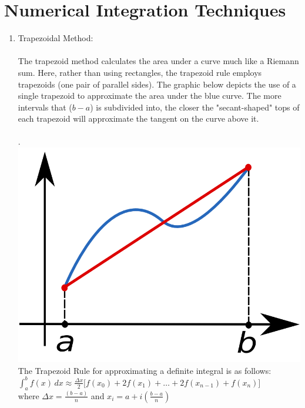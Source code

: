 \documentclass{report}
\begin{document}
\section{Numerical Integration Techniques}
\begin{enumerate}
\item Trapezoidal Method:
\\
\\
The trapezoid method calculates the area under a curve much like a Riemann sum. Here, rather than using rectangles, the trapezoid rule employs trapezoids (one pair of parallel sides). The graphic below depicts the use of a single trapezoid to approximate the area under the blue curve. The more intervals that ($b-a$) is subdivided into, the closer the "secant-shaped" tops of each trapezoid will approximate the tangent on the curve above it.\\
\\
. \hspace{30 mm} \includegraphics[scale=.15]{trapezoid.png}
\\
The Trapezoid Rule for approximating a definite integral is as follows:
\\ $\displaystyle \int^b_a f(x)\,dx  \approx  \frac{\Delta x}{2}\Big[f(x_{0})+2f(x_1)+\ldots+2f(x_{n-1})+f(x_n)\Big]$ 
\\where \hspace{10 mm} $\displaystyle \Delta x = \frac{(b-a)}{n}$ 
\hspace{7 mm} and \hspace{7 mm} $\displaystyle x_i = a + i(\frac{b-a}{n})$
\\

\end{enumerate}
\end{document}
